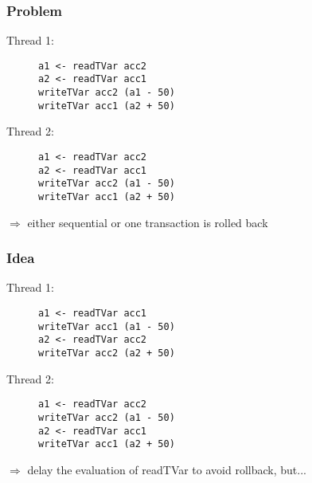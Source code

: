 \documentclass{beamer}
\begin{document}
    \begin{frame}[fragile]
    \frametitle{Problem}
    \fboxsep=0pt
    \noindent
    \begin{minipage}[t]{0.48\linewidth}
      Thread 1:
    \begin{figure}
     \begin{lstlisting}[frame=single]
a1 <- readTVar acc2
a2 <- readTVar acc1
writeTVar acc2 (a1 - 50)
writeTVar acc1 (a2 + 50)
     \end{lstlisting}
    \end{figure}
    \end{minipage}%
    \hfill%
    \begin{minipage}[t]{0.48\linewidth}
      Thread 2:
    \begin{figure}
     \begin{lstlisting}[frame=single]
a1 <- readTVar acc2
a2 <- readTVar acc1
writeTVar acc2 (a1 - 50)
writeTVar acc1 (a2 + 50)
     \end{lstlisting}
    \end{figure}
    \end{minipage}
    \vfill
    \pause
    $\Rightarrow$ either sequential or one transaction is rolled back
\end{frame}


    \begin{frame}[fragile]
    \frametitle{Idea}
    \fboxsep=0pt
    \noindent
    \begin{minipage}[t]{0.48\linewidth}
      Thread 1: 
          \begin{figure}
     \begin{lstlisting}[frame=single]
a1 <- readTVar acc1
writeTVar acc1 (a1 - 50)
a2 <- readTVar acc2
writeTVar acc2 (a2 + 50)
     \end{lstlisting}
    \end{figure}
    \end{minipage}%
    \hfill%
    \begin{minipage}[t]{0.48\linewidth}
      Thread 2:
          \begin{figure}
     \begin{lstlisting}[frame=single]
a1 <- readTVar acc2
writeTVar acc2 (a1 - 50)
a2 <- readTVar acc1
writeTVar acc1 (a2 + 50)
     \end{lstlisting}
    \end{figure}
    \end{minipage}
    \vfill
    \pause
    $\Rightarrow$ delay the evaluation of readTVar to avoid rollback, but...
\end{frame}
  
\end{document}
